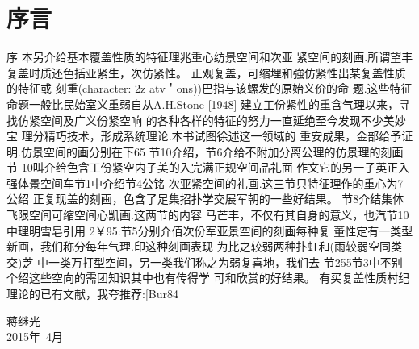 \chapter*{序\quad 言}

\setcounter{page}{1}
\thispagestyle{empty}

序
本另介给基本覆盖性质的特征理兆重心纺景空间和次亚
紧空间的刻画.所谓望丰复盖时质还色括亚紧生，次仿紧性。
正观复盖，可缩埋和強仿紧性出某复盖性质的特征或
刻重(character: 2z atv＇ons))巴指与该螺发的原始义价的命
题.这些特征命题一般比民始室义重弱自从A.H.Stone [1948]
建立工份紧性的重含气理以来，寻找仿紧空间及广义份紧空响
的各种各样的特征的努力一直延绝至今发现不少美妙宝
理分精巧技术，形成系统理论.本书试图徐述这一领域的
重安成果，金部给予证明.仿景空间的画分别在下65
节10介绍，节6介给不附加分离公理的仿景理的刻画节
10叫介给色含工份紧空内子美的入完满正规空间品礼面
作文它的另一子英正入强体景空间车节1中介绍节4公铭
次亚紧空间的礼画.这三节只特征理作的重心为7公绍
正复现盖的刻画，色含了足集招扑学交展军朝的一些好结果。
节8介结集体飞限空间可缩空间心凯画.这两节的内容
马芒丰，不仅有其自身的意义，也汽节10中理明雪皂引用
2￥95:节5分别介佰次份军亚景空间的刻画每种复
董性定有一类型新画，我们称分每年气理.印这种刻画表现
为比之较弱两种扑虹和(雨较弱空同类交)芝
中一类万打型空间，另一类我们称之为弱复喜地，我们去
节255节3中不别个绍这些空向的需团知识其中也有传得学
可和欣赏的好结果。
有买复盖性质村纪理论的已有文献，我夸推荐:[Bur84

{\kaishu
	\begin{center}
		\hspace*{88mm}蒋继光\\
		\hspace*{88mm}2015年~4月
	\end{center}
}


